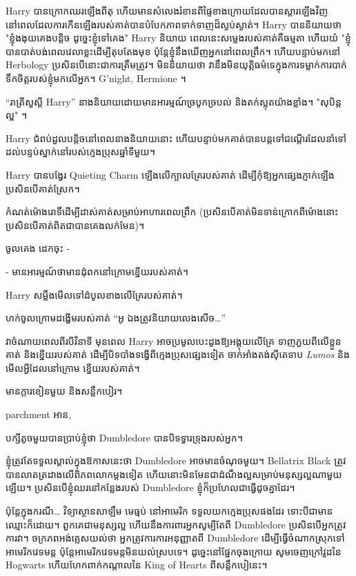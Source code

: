 {{{{{{{{{{{{{Harry បានក្រោកឈរឡើងពីតុ ហើយមានសំលេងរំខានពីផ្ទៃខាងក្រោយដែលបានស្ដារឡើងវិញ នៅពេលដែលការកើនឡើងរបស់គាត់បានបំបែកភាពទាក់ទាញដ៏ស្ងប់ស្ងាត់។ Harry បាននិយាយថា "ខ្ញុំងងុយគេងបន្តិច ដូច្នេះខ្ញុំទៅគេង" Harry និយាយ ពេលនេះសម្លេងរបស់គាត់គឺធម្មតា ហើយយំ "ខ្ញុំបានបាត់បង់ពេលវេលាខ្លះដើម្បីតុបតែងមុខ ប៉ុន្តែខ្ញុំនឹងឃើញអ្នកនៅពេលព្រឹក។ ហើយបន្ទាប់មកនៅ Herbology ប្រសិនបើនោះជាការត្រឹមត្រូវ។ មិន​និយាយ​ថា វា​នឹង​មិន​យុត្តិធម៌​ទេ​ក្នុង​ការ​ទម្លាក់​ការ​បាក់​ទឹកចិត្ត​របស់​ខ្ញុំ​មក​លើ​អ្នក។ G'night, Hermione ។

“រាត្រីសួស្តី Harry” នាងនិយាយដោយមានអារម្មណ៍ច្របូកច្របល់ និងតក់ស្លុតយ៉ាងខ្លាំង។ "សុបិន្តល្អ" ។

Harry ជំពប់ដួលបន្តិចនៅពេលនាងនិយាយនោះ ហើយបន្ទាប់មកគាត់បានបន្តទៅជណ្តើរដែលនាំទៅដល់បន្ទប់ស្នាក់នៅរបស់ក្មេងប្រុសឆ្នាំទីមួយ។

\later

Harry បានបង្វែរ Quieting Charm ឡើងលើក្បាលគ្រែរបស់គាត់ ដើម្បីកុំឱ្យអ្នកផ្សេងភ្ញាក់ឡើង ប្រសិនបើគាត់ស្រែក។

កំណត់ម៉ោងរោទិ៍ដើម្បីដាស់គាត់សម្រាប់អាហារពេលព្រឹក (ប្រសិនបើគាត់មិនទាន់ក្រោកពីម៉ោងនោះ ប្រសិនបើគាត់ពិតជាបានគេងលក់មែន)។

ចូលគេង ដេកចុះ -

- មានអារម្មណ៍ថាមានដុំពកនៅក្រោមខ្នើយរបស់គាត់។

Harry សម្លឹងមើលទៅដំបូលខាងលើគ្រែរបស់គាត់។

ហក់​ចូល​ក្រោម​ដង្ហើម​របស់​គាត់ “អូ ឯង​ត្រូវ​និយាយ​លេង​សើច…”

វាចំណាយពេលពីរបីវិនាទី មុនពេល Harry អាចប្រមូលបេះដូងឱ្យអង្គុយលើគ្រែ ទាញភួយពីលើខ្លួនគាត់ និងខ្នើយរបស់គាត់ ដើម្បីបិទបាំងទង្វើពីក្មេងប្រុសផ្សេងទៀត ចាក់អាំងតង់ស៊ីតេទាប \emph{Lumos} និងមើលអ្វីដែលនៅក្រោម ខ្នើយរបស់គាត់។

មាន​ក្តារ​ខៀន​មួយ និង​សន្លឹក​បៀរ។

parchment អាន,

\begin{writtenNote}
បក្សីតូចមួយបានប្រាប់ខ្ញុំថា Dumbledore បានបិទទ្វារទ្រុងរបស់អ្នក។

ខ្ញុំត្រូវតែទទួលស្គាល់ក្នុងឱកាសនេះថា Dumbledore អាចមានចំណុចមួយ។ Bellatrix Black ត្រូវ​បាន​លាតត្រដាង​លើ​ពិភពលោក​ម្ដង​ទៀត ហើយ​នោះ​មិន​មែន​ជា​ដំណឹង​ល្អ​សម្រាប់​មនុស្ស​ល្អ​ណា​មួយ​ឡើយ។ ប្រសិនបើខ្ញុំឈរនៅកន្លែងរបស់ Dumbledore ខ្ញុំក៏ប្រហែលជាធ្វើដូចគ្នាដែរ។

ប៉ុន្តែក្នុងករណី… វិទ្យាស្ថានសាឡឹម មេធ្មប់ នៅអាមេរិក ទទួលយកក្មេងប្រុសផងដែរ ទោះបីជាមានឈ្មោះក៏ដោយ។ ពួកគេជាមនុស្សល្អ ហើយនឹងការពារអ្នកសូម្បីតែពី Dumbledore ប្រសិនបើអ្នកត្រូវការវា។ ចក្រភព​អង់គ្លេស​យល់​ថា អ្នក​ត្រូវ​ការ​ការ​អនុញ្ញាត​ពី Dumbledore ដើម្បី​ធ្វើ​ចំណាក​ស្រុក​ទៅ​អាមេរិក​វេទមន្ត ប៉ុន្តែ​អាមេរិក​វេទមន្ត​មិន​យល់​ស្រប​ទេ។ ដូច្នេះនៅផ្នែកចុងក្រោយ សូមចេញក្រៅវួដនៃ Hogwarts ហើយហែកពាក់កណ្តាលនៃ King of Hearts ពីសន្លឹកបៀនេះ។


\end{writtenNote}}}}}}}}}}}}}}

